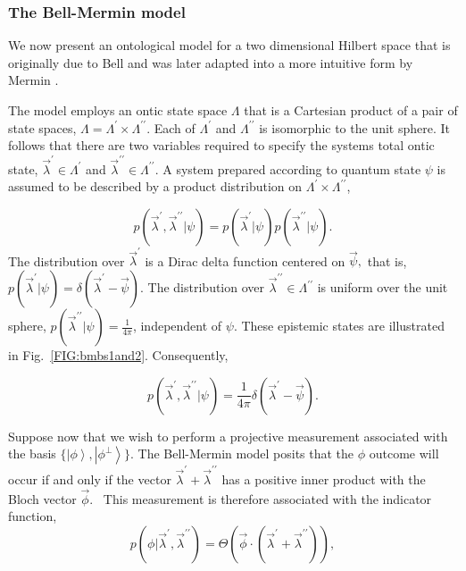 \documentclass[aps,nofootinbib,12pt]{revtex4}
\begin{document}
\subsubsection{The Bell-Mermin model \label{SEC:example_bellmermin}}

We now present an ontological model for a two dimensional Hilbert
space that is originally due to Bell \cite{Bell_probhv} and was
later adapted into a more intuitive form by Mermin
\cite{Mermin_bell}. \

The model employs an ontic state space $\Lambda$ that is a Cartesian
product of a pair of state spaces,
$\Lambda=\Lambda^{\prime}\times\Lambda ^{\prime\prime}$. Each of
$\Lambda^{\prime}$ and $\Lambda^{\prime\prime}$ is isomorphic to the
unit sphere. It follows that there are two variables required to
specify the systems total ontic state,
$\vec{\lambda}^{\prime}\in\Lambda^{\prime}$ and
$\vec{\lambda}^{\prime\prime}\in\Lambda^{\prime\prime}$. A system
prepared according to quantum state $\psi$ is assumed to be
described by a product
distribution on $\Lambda^{\prime}\times\Lambda^{\prime\prime}$,%

\begin{equation}
p(\vec{\lambda}^{\prime},\vec{\lambda}^{\prime\prime}|\psi)=p(\vec{\lambda
}^{\prime}|\psi)p(\vec{\lambda}^{\prime\prime}|\psi).
\end{equation}
The distribution over $\vec{\lambda}^{\prime}$ is a Dirac delta
function centered on $\vec{\psi},$ that is,
$p(\vec{\lambda}^{\prime}|\psi)=\delta(\vec{\lambda}^{\prime}-\vec{\psi})$.
The distribution over
$\vec{\lambda}^{\prime\prime}\in\Lambda^{\prime\prime}$ is uniform
over the unit sphere,
$p(\vec{\lambda}^{\prime\prime}|\psi)=\frac{1}{4\pi}$, independent
of $\psi $. These epistemic states are illustrated in
Fig.~\ref{FIG:bmbs1and2}. Consequently,

\begin{equation}
p(\vec{\lambda}^{\prime},\vec{\lambda}^{\prime\prime}|\psi)=\frac{1}{4\pi
}\delta(\vec{\lambda}^{\prime}-\vec{\psi}).
\end{equation}


Suppose now that we wish to perform a projective measurement
associated with the basis $\{\left\vert \phi\right\rangle
,\left\vert \phi^{\perp }\right\rangle \}$. The Bell-Mermin model
posits that the $\phi$ outcome will occur if and only if the vector
$\vec{\lambda}^{\prime}+\vec{\lambda }^{\prime\prime}$ has a
positive inner product with the Bloch vector $\vec{\phi}.$ \ This
measurement is therefore associated with the indicator function,
\begin{equation}
p(\phi|\vec{\lambda}^{\prime},\vec{\lambda}^{\prime\prime})=\Theta(\vec{\phi
}\cdot(\vec{\lambda}^{\prime}+\vec{\lambda}^{\prime\prime})),
\label{BMif}
\end{equation}
\end{document}
